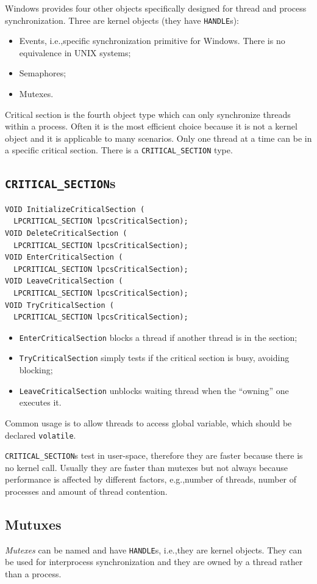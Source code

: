 Windows provides four other objects specifically designed for thread and process synchronization. Three are kernel objects (they have \texttt{HANDLE}s):
\begin{itemize}
\item Events, i.e.,\@ specific synchronization primitive for Windows. There is no equivalence in UNIX systems;
\item Semaphores;
\item Mutexes.
\end{itemize}
Critical section is the fourth object type which can only synchronize threads within a process. Often it is the most efficient choice because it is not a kernel object and it is applicable to many scenarios. Only one thread at a time can be in a specific critical section. There is a \texttt{CRITICAL\_SECTION} type.

\subsection{\texttt{CRITICAL\_SECTION}s}
\begin{verbatim}
VOID InitializeCriticalSection (
  LPCRITICAL_SECTION lpcsCriticalSection);
VOID DeleteCriticalSection (
  LPCRITICAL_SECTION lpcsCriticalSection);
VOID EnterCriticalSection (
  LPCRITICAL_SECTION lpcsCriticalSection);
VOID LeaveCriticalSection (
  LPCRITICAL_SECTION lpcsCriticalSection);
VOID TryCriticalSection (
  LPCRITICAL_SECTION lpcsCriticalSection);
\end{verbatim}

\begin{itemize}
\item \texttt{EnterCriticalSection} blocks a thread if another thread is in the section;
\item \texttt{TryCriticalSection} simply tests if the critical section is busy, avoiding blocking;
\item \texttt{LeaveCriticalSection} unblocks waiting thread when the ``owning'' one executes it.
\end{itemize}
Common usage is to allow threads to access global variable, which should be declared \texttt{volatile}.

\texttt{CRITICAL\_SECTION}s test in user-space, therefore they are faster because there is no kernel call. Usually they are faster than mutexes but not always because performance is affected by different factors, e.g.,\@ number of threads, number of processes and amount of thread contention.

\subsection{Mutuxes}
\emph{Mutexes} can be named and have \texttt{HANDLE}s, i.e.,\@ they are kernel objects. They can be used for interprocess synchronization and they are owned by a thread rather than a process.

